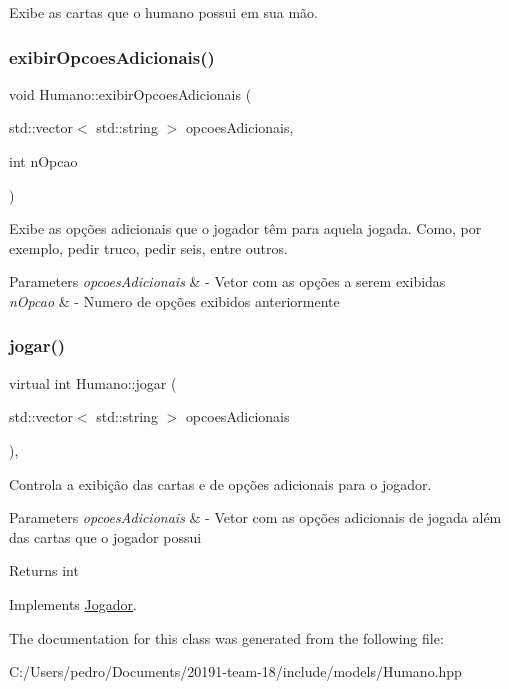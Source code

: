 Exibe as cartas que o humano possui em sua mão. 

\mbox{\label{class_humano_a9be2c952d918117be73a00f2c538834c}} 
\subsubsection{\texorpdfstring{exibirOpcoesAdicionais()}{exibirOpcoesAdicionais()}}
{\footnotesize\ttfamily void Humano\+::exibir\+Opcoes\+Adicionais (\begin{DoxyParamCaption}\item[{std\+::vector$<$ std\+::string $>$}]{opcoes\+Adicionais,  }\item[{int}]{n\+Opcao }\end{DoxyParamCaption})}



Exibe as opções adicionais que o jogador têm para aquela jogada. Como, por exemplo, pedir truco, pedir seis, entre outros. 


\begin{DoxyParams}{Parameters}
{\em opcoes\+Adicionais} & -\/ Vetor com as opções a serem exibidas \\
\hline
{\em n\+Opcao} & -\/ Numero de opções exibidos anteriormente \\
\hline
\end{DoxyParams}
\mbox{\label{class_humano_aad706f019b99747f9c49d915f678998d}} 
\subsubsection{\texorpdfstring{jogar()}{jogar()}}
{\footnotesize\ttfamily virtual int Humano\+::jogar (\begin{DoxyParamCaption}\item[{std\+::vector$<$ std\+::string $>$}]{opcoes\+Adicionais }\end{DoxyParamCaption})\hspace{0.3cm}{\ttfamily [override]}, {\ttfamily [virtual]}}



Controla a exibição das cartas e de opções adicionais para o jogador. 


\begin{DoxyParams}{Parameters}
{\em opcoes\+Adicionais} & -\/ Vetor com as opções adicionais de jogada além das cartas que o jogador possui \\
\hline
\end{DoxyParams}
\begin{DoxyReturn}{Returns}
int 
\end{DoxyReturn}


Implements \mbox{\hyperlink{class_jogador}{Jogador}}.



The documentation for this class was generated from the following file\+:\begin{DoxyCompactItemize}
\item 
C\+:/\+Users/pedro/\+Documents/20191-\/team-\/18/include/models/Humano.\+hpp\end{DoxyCompactItemize}
